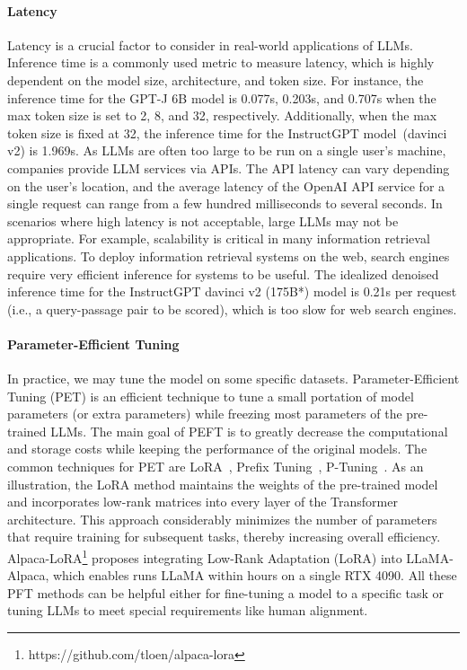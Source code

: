 \documentclass[manuscript,screen, nonacm]{acmart}
\begin{document}
\paragraph{Latency}
Latency is a crucial factor to consider in real-world applications of LLMs. Inference time is a commonly used metric to measure latency, which is highly dependent on the model size, architecture, and token size. For instance, the inference time for the GPT-J 6B model is 0.077s, 0.203s, and 0.707s when the max token size is set to 2, 8, and 32, respectively. Additionally, when the max token size is fixed at 32, the inference time for the InstructGPT model~(davinci v2) is 1.969s.
As LLMs are often too large to be run on a single user's machine, companies provide LLM services via APIs. The API latency can vary depending on the user's location, and the average latency of the OpenAI API service for a single request can range from a few hundred milliseconds to several seconds.
In scenarios where high latency is not acceptable, large LLMs may not be appropriate. For example, scalability is critical in many information retrieval applications. To deploy information retrieval systems on the web, search engines require very efficient inference for systems to be useful. The idealized denoised inference time for the InstructGPT davinci v2 (175B*) model is 0.21s per request (i.e., a query-passage pair to be scored), which is too slow for web search engines.


\paragraph{Parameter-Efficient Tuning} In practice, we may tune the model on some specific datasets. Parameter-Efficient Tuning (PET) is an efficient technique to tune a small portation of model parameters (or extra parameters) while freezing most parameters of the pre-trained LLMs. The main goal of PEFT is to greatly decrease the computational and storage costs while keeping the performance of the original models. The common techniques for PET are LoRA~\cite{hu2021lora}, Prefix Tuning~\cite{li2021prefix}, P-Tuning~\cite{liu2022p,liu2021p2}. As an illustration, the LoRA method maintains the weights of the pre-trained model and incorporates low-rank matrices into every layer of the Transformer architecture. This approach considerably minimizes the number of parameters that require training for subsequent tasks, thereby increasing overall efficiency. Alpaca-LoRA\footnote{https://github.com/tloen/alpaca-lora} proposes integrating Low-Rank Adaptation (LoRA) into LLaMA-Alpaca, which enables runs LLaMA within hours on a single RTX 4090. All these PFT methods can be helpful either for fine-tuning a model to a specific task or tuning LLMs to meet special requirements like human alignment. 
\end{document}
